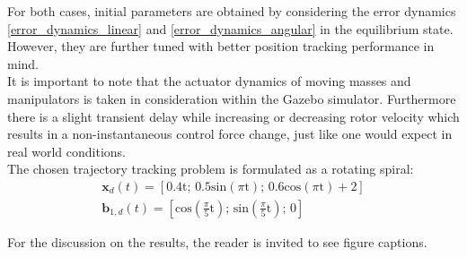 For both cases, initial parameters are obtained by considering the error dynamics \eqref{error_dynamics_linear} and \eqref{error_dynamics_angular} in the equilibrium state. However, they are further tuned with better position tracking performance in mind.\\
It is important to note that the actuator dynamics of moving masses and manipulators is taken in consideration within the Gazebo simulator. Furthermore there is a slight transient delay while increasing or decreasing rotor velocity which results in a non-instantaneous control force change, just like one would expect in real world conditions. \\
\indent The chosen trajectory tracking problem is formulated as a rotating spiral:
\begin{gather*}
	\textbf{x}_d(t) = [0.4\text{t}; \, 0.5\text{sin}(\pi\text{t}); \, 0.6\text{cos}(\pi\text{t}) + 2] \\
	\textbf{b}_{1,d}(t) = [\text{cos}\left(\frac{\pi}{5}\text{t}\right); \, \text{sin}\left(\frac{\pi}{5}\text{t}\right); \, 0]
\end{gather*}

For the discussion on the results, the reader is invited to see figure captions. 

